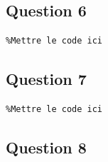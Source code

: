 \documentclass[a4paper,11pt]{article}
\begin{document}
\subsection{Question 6}
\begin{verbatim}
%Mettre le code ici
\end{verbatim}

\subsection{Question 7}
\begin{verbatim}
%Mettre le code ici
\end{verbatim}

\subsection{Question 8}
\begin{center}
\end{center}
\end{document}
